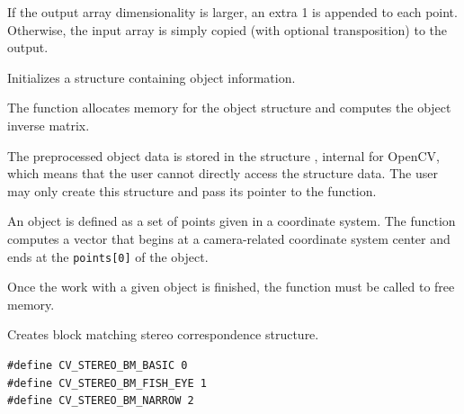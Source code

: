 If the output array dimensionality is larger, an extra 1 is appended to each point.  Otherwise, the input array is simply copied (with optional transposition) to the output.


\ifCPy

Initializes a structure containing object information.


\begin{description}
\ifC
{}
\else
{}
\fi
\end{description}

The function allocates memory for the object structure and computes the object inverse matrix.

The preprocessed object data is stored in the structure , internal for OpenCV, which means that the user cannot directly access the structure data. The user may only create this structure and pass its pointer to the function.

An object is defined as a set of points given in a coordinate system. The function  computes a vector that begins at a camera-related coordinate system center and ends at the \texttt{points[0]} of the object.

Once the work with a given object is finished, the function  must be called to free memory.

Creates block matching stereo correspondence structure.

\begin{lstlisting}
#define CV_STEREO_BM_BASIC 0
#define CV_STEREO_BM_FISH_EYE 1
#define CV_STEREO_BM_NARROW 2
\end{lstlisting}


